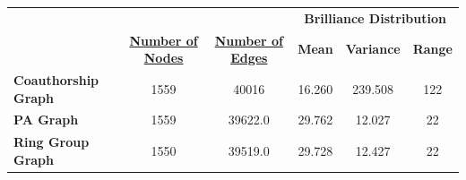 \documentclass[12pt,a4paper]{article}
\begin{document}
\begin{table}[h]
	\begin{tabular}{lccccc}
		\multicolumn{3}{l}{}                                                                                                                                          & \multicolumn{3}{c}{\textbf{Brilliance Distribution}} \\ \cline{2-6} 
		\multicolumn{1}{l|}{}                             & \multicolumn{1}{c|}{{\ul \textbf{Number of Nodes}}} & \multicolumn{1}{c|}{{\ul \textbf{Number of Edges}}} & \multicolumn{1}{c|}{\textbf{Mean}} & \multicolumn{1}{c|}{\textbf{Variance}} & \multicolumn{1}{c|}{\textbf{Range}} \\ \hline
		\multicolumn{1}{|l|}{\textbf{Coauthorship Graph}} & \multicolumn{1}{c|}{1559}                           & \multicolumn{1}{c|}{40016}                          & \multicolumn{1}{c|}{16.260}        & \multicolumn{1}{c|}{239.508}           & \multicolumn{1}{c|}{122}            \\ \hline
		\multicolumn{1}{|l|}{\textbf{PA Graph}}           & \multicolumn{1}{c|}{1559}                           & \multicolumn{1}{c|}{39622.0}                        & \multicolumn{1}{c|}{29.762}        & \multicolumn{1}{c|}{12.027}            & \multicolumn{1}{c|}{22}             \\ \hline
		\multicolumn{1}{|l|}{\textbf{Ring Group Graph}}   & \multicolumn{1}{c|}{1550}                           & \multicolumn{1}{c|}{39519.0}                        & \multicolumn{1}{c|}{29.728}        & \multicolumn{1}{c|}{12.427}            & \multicolumn{1}{c|}{22}             \\ \hline
	\end{tabular}
\end{table}
\end{document}
